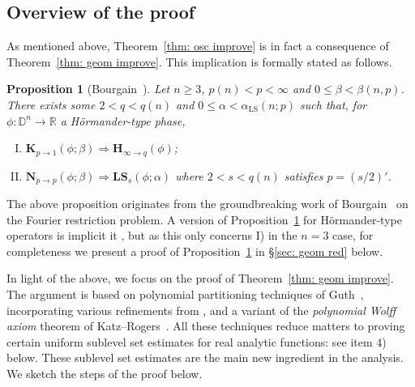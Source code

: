 \documentclass[reqno]{amsart}
\numberwithin{equation}{section}
\newcommand{\D}{\mathbb{D}}
\newcommand{\R}{\mathbb{R}}
\newcommand{\bH}{\mathbf{H}}
\newcommand{\bK}{\mathbf{K}}
\newcommand{\bN}{\mathbf{N}}
\newcommand{\bLS}{\mathbf{LS}}
\theoremstyle{plain}
\newtheorem{proposition}[theorem]{Proposition}
\theoremstyle{definition}
\begin{document}



\subsection{Overview of the proof} As mentioned above, Theorem~\ref{thm: osc improve} is in fact a consequence of Theorem~\ref{thm: geom improve}. This implication is formally stated as follows. 


\begin{proposition}[Bourgain~\cite{Bourgain1991}]\label{prop: geom red} 
 Let $n \geq 3$, $p(n) < p < \infty$ and $0 \leq \beta < \beta(n,p)$. There exists some $2 < q < q(n)$ and $0 \leq \alpha < \alpha_{\mathrm{LS}}(n;p)$ such that, for $\phi \colon \D^n \to \R$ a H\"ormander-type phase, 
\begin{enumerate}[I)]
    \item $\bK_{p \to 1}(\phi;  \beta) \Rightarrow \bH_{\infty \to q}(\phi)$;
    \item $\bN_{p \to p}(\phi;  \beta) \Rightarrow \bLS_s(\phi; \alpha)$ where $2 < s < q(n)$ satisfies $p = (s/2)'$.
\end{enumerate}
\end{proposition}

The above proposition originates from the groundbreaking work of Bourgain~\cite{Bourgain1991a} on the Fourier restriction problem. A version of Proposition~\ref{prop: geom red} for H\"ormander-type operators is implicit it \cite{Bourgain1991}, but as this only concerns I) in the $n=3$ case, for completeness we present a proof of Proposition~\ref{prop: geom red} in \S\ref{sec: geom red} below.

In light of the above, we focus on the proof of Theorem~\ref{thm: geom improve}. The argument is based on polynomial partitioning techniques of Guth~\cite{Guth2016, Guth2018}, incorporating various refinements from \cite{HRZ2022, Zahl2021}, and a variant of the \textit{polynomial Wolff axiom} theorem of Katz--Rogers~\cite{KR2018}. All these techniques reduce matters to proving certain uniform sublevel set estimates for real analytic functions: see item 4) below. These sublevel set estimates are the main new ingredient in the analysis. We sketch the steps of the proof below. \medskip
\end{document}
